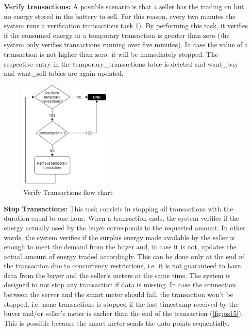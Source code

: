 \textbf{Verify transactions:} A possible scenario is that a seller has the trading on but no energy stored in the battery to sell. For this reason, every two minutes the system runs a verification transactions task \cref{fig:ps14}). By performing this task, it verifies if the consumed energy in a temporary transaction is greater than zero (the system only verifies transactions running over five minutes). In case the value of a transaction is not higher than zero, it will be immediately stopped. The respective entry in the temporary\_transactions table is deleted and want\_buy and want\_sell tables are again updated.


\begin{figure}[h]
\centering
\includegraphics[width=0.4\textwidth]{./Images/ps14}
\caption{Verify Transactions flow chart}
\label{fig:ps14}
\end{figure}


\textbf{Stop Transactions:} This task consists in stopping all transactions with the duration equal to one hour. When a transaction ends, the system verifies if the energy actually used  by the buyer corresponds to the requested amount. In other words, the system verifies if the surplus energy made available by the seller is enough to meet the demand from the buyer and, in case it is not, updates the actual amount of energy traded accordingly. This can be done only at the end of the transaction due to concurrency restrictions, i.e. it is not guaranteed to have data from the buyer and the seller’s meters at the same time. The system is designed to not  stop any transaction if data is missing. In case the connection between the server and the smart meter should fail, the transaction won’t be stopped, i.e. none transactions is stopped if the last timestamp received by the buyer and/or seller’s meter is earlier than the end of the transaction (\cref{fig:ps15}). This is possible because the smart meter sends the data points sequentially.



